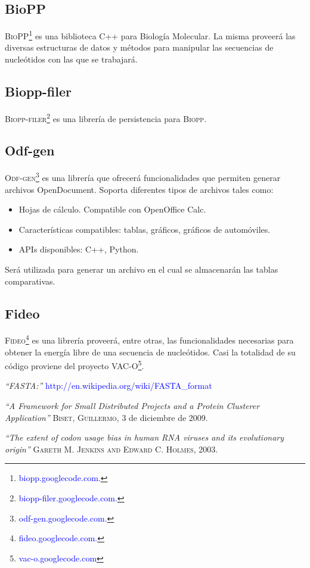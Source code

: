 \documentclass[12pt,a4paper,spanish]{article}
\begin{document}
	\subsection{BioPP}
		\par \textsc{BioPP}\footnote{\textcolor{blue}{biopp.googlecode.com.}} es una biblioteca C++ para Biología Molecular. La misma proveerá las 			diversas estructuras de datos y métodos para manipular las secuencias de nucleótidos con las que se trabajará. 		

	\subsection{Biopp-filer}
		 \par \textsc{Biopp-filer}\footnote{\textcolor{blue}{biopp-filer.googlecode.com.}} es una librería de persistencia para \textsc{Biopp}. 

	\subsection{Odf-gen}
		\textsc{Odf-gen}\footnote{\textcolor{blue}{odf-gen.googlecode.com.}} es una librería que ofrecerá funcionalidades que permiten generar archivos 			OpenDocument. Soporta diferentes tipos de archivos tales como:
		\begin{itemize}
			\item Hojas de cálculo. Compatible con OpenOffice Calc.
			\item Características compatibles: tablas, gráficos, gráficos de automóviles.
			\item APIs disponibles: C++, Python.
		\end{itemize}
		 \par Será utilizada para generar un archivo en el cual se almacenarán las tablas comparativas.	
		 
	\subsection{Fideo}
			\textsc{Fideo}\footnote{\textcolor{blue}{fideo.googlecode.com.}} es una librería proveerá, entre otras, las funcionalidades necesarias para 			obtener la energía libre de una secuencia de nucleótidos. Casi la totalidad de su código proviene del proyecto VAC-O\footnote{\textcolor{blue}{vac-o.googlecode.com}}. 						

\begin{thebibliography}{99}
\small	{} {\em{“FASTA:”}} \textcolor{blue}{http://en.wikipedia.org/wiki/FASTA\_format}

\small	{} {\em{“A Framework for Small Distributed Projects and a Protein Clusterer Application”}}
			\textsc{Biset, Guillermo}, 3 de diciembre de 2009.

\small {} {\em{“The extent of codon usage bias in human RNA viruses and its evolutionary origin”}}
			\textsc{Gareth M. Jenkins and Edward C. Holmes}, 2003.
 
\end{thebibliography}
\end{document}
